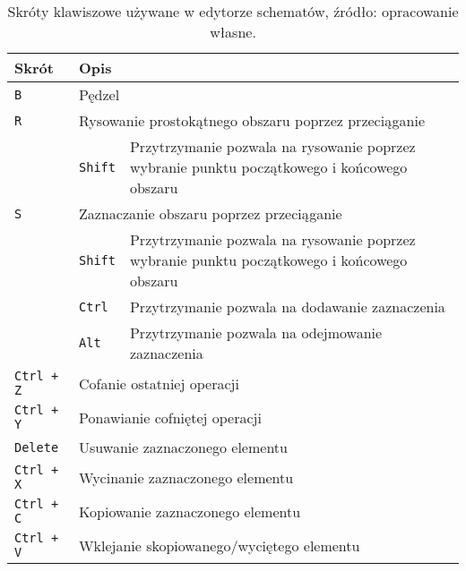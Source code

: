 \begin{table}[h]
    \centering
    \caption[Skróty klawiszowe używane w edytorze schematów.]
    {Skróty klawiszowe używane w edytorze schematów, źródło: opracowanie własne.}
    \label{tab:key_shortcuts}
    \begin{tabular}{|l||l|p{}|}
        \hline
        Skrót & \multicolumn{2}{|l|}{Opis} \\
        \hline
        \hline
        \texttt{B} & \multicolumn{2}{|l|}{Pędzel} \\
        \hline
        \texttt{R} & \multicolumn{2}{|l|}{Rysowanie prostokątnego obszaru poprzez przeciąganie} \\
        \cline{2-3}
        & \texttt{Shift} & Przytrzymanie pozwala na rysowanie poprzez wybranie punktu początkowego i końcowego obszaru \\
        \hline
        \texttt{S} & \multicolumn{2}{|l|}{Zaznaczanie obszaru poprzez przeciąganie} \\
        \cline{2-3}
        & \texttt{Shift} & Przytrzymanie pozwala na rysowanie poprzez wybranie punktu początkowego i końcowego obszaru \\
        \cline{2-3}
        & \texttt{Ctrl} & Przytrzymanie pozwala na dodawanie zaznaczenia \\
        \cline{2-3}
        & \texttt{Alt} & Przytrzymanie pozwala na odejmowanie zaznaczenia \\
        \hline
        \texttt{Ctrl + Z} & \multicolumn{2}{|l|}{Cofanie ostatniej operacji} \\
        \hline
        \texttt{Ctrl + Y} & \multicolumn{2}{|l|}{Ponawianie cofniętej operacji} \\
        \hline
        \texttt{Delete} & \multicolumn{2}{|l|}{Usuwanie zaznaczonego elementu} \\
        \hline
        \texttt{Ctrl + X} & \multicolumn{2}{|l|}{Wycinanie zaznaczonego elementu} \\
        \hline
        \texttt{Ctrl + C} & \multicolumn{2}{|l|}{Kopiowanie zaznaczonego elementu} \\
        \hline
        \texttt{Ctrl + V} & \multicolumn{2}{|l|}{Wklejanie skopiowanego/wyciętego elementu} \\
        \hline
    \end{tabular}
\end{table}\

